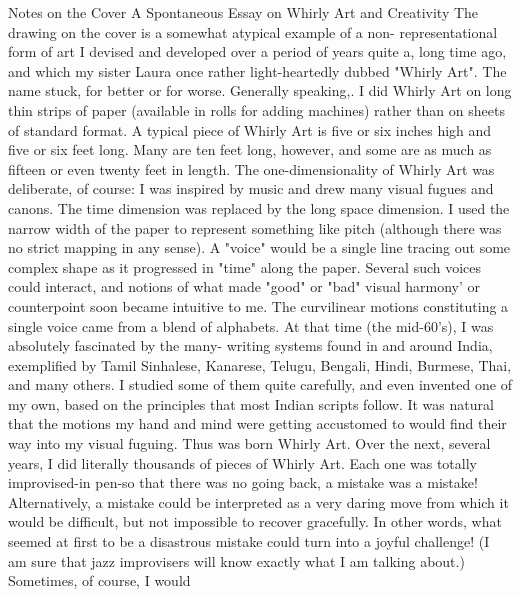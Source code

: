

Notes on the Cover 
A Spontaneous Essay on Whirly Art and Creativity 
The drawing on the cover is a somewhat atypical example of a non- representational form of art I devised and developed over a period of years quite a, long time ago, and which my sister Laura once rather light-heartedly dubbed "Whirly Art". The name stuck, for better or for worse. Generally speaking,. I did Whirly Art on long thin strips of paper (available in rolls for adding machines) rather than on sheets of standard format. A typical piece of Whirly Art is five or six inches high and five or six feet long. Many are ten feet long, however, and some are as much as fifteen or even twenty feet in length. The one-dimensionality of Whirly Art was deliberate, of course: I was inspired by music and drew many visual fugues and canons. The time dimension was replaced by the long space dimension. I used the narrow width of the paper to represent something like pitch (although there was no strict mapping in any sense). A "voice" would be a single line tracing out some complex shape as it progressed in "time" along the paper. Several such voices could interact, and notions of what made "good" or "bad" visual harmony' or counterpoint soon became intuitive to me. The curvilinear motions constituting a single voice came from a blend of alphabets. At that time (the mid-60's), I was absolutely fascinated by the many- writing systems found in and around India, exemplified by Tamil Sinhalese, Kanarese, Telugu, Bengali, Hindi, Burmese, Thai, and many others. I studied some of them quite carefully, and even invented one of my own, based on the principles that most Indian scripts follow. It was natural that the motions my hand and mind were getting accustomed to would find their way into my visual fuguing. Thus was born Whirly Art. Over the next, several years, I did literally thousands of pieces of Whirly Art. Each one was totally improvised-in pen-so that there was no going back, a mistake was a mistake! Alternatively, a mistake could be interpreted as a very daring move from which it would be difficult, but not impossible to recover gracefully. In other words, what seemed at first to be a disastrous mistake could turn into a joyful challenge! (I am sure that jazz improvisers will know exactly what I am talking about.) Sometimes, of course, I would 



